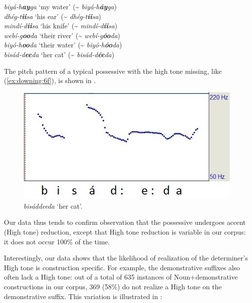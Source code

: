 \documentclass[output=paper]{langscibook}
\begin{document}
\ea\label{ex:downing:6}
\ea  \textit{biyá-h}\textbf{\textit{ay}}\textit{ga}   ‘my water’  ({\textasciitilde} \textit{biyá-h}\textbf{\textit{áy}}\textit{ga}) \label{ex:downing:6a}\\
\ex   \textit{dhég-t}\textbf{\textit{ii}}\textit{sa}   ‘his ear’  ({\textasciitilde} \textit{dhég-t}\textbf{\textit{íi}}\textit{sa})\label{ex:downing:6b}\\
\ex   \textit{mindí-d}\textbf{\textit{ii}}\textit{sa}   ‘his knife’  ({\textasciitilde} \textit{mindí-d}\textbf{\textit{íi}}\textit{sa})\label{ex:downing:6c}\\
\ex   \textit{webí-g}\textbf{\textit{oo}}\textit{da}  ‘their river’  ({\textasciitilde} \textit{webí-g}\textbf{\textit{óo}}\textit{da})\label{ex:downing:6d}\\
\ex   \textit{biyó-h}\textbf{\textit{oo}}\textit{da}   ‘their water’  ({\textasciitilde} \textit{biyó-h}\textbf{\textit{óo}}\textit{da})\label{ex:downing:6e}\\
\ex   \textit{bisád-d}\textbf{\textit{ee}}\textit{da}   ‘her cat’  ({\textasciitilde} \textit{bisád-d}\textbf{\textit{ée}}\textit{da})\label{ex:downing:6f}\\
\z
\z

The pitch pattern of a typical possessive with the high tone missing, like (\ref{ex:downing:6f}), is shown in .

  
\begin{figure}  
\includegraphics[width=.75\textwidth]{figures/downing-img1.jpg}
\caption{ \textit{bisáddeeda} ‘her cat’.}
\label{fig:downing:1}
\end{figure}



Our data thus tends to confirm  observation that the possessive undergoes accent (High tone) reduction, except that High tone reduction is variable in our corpus: it does not occur 100\% of the time.

Interestingly, our data shows that the likelihood of realization of the determiner’s High tone is construction specific. For example, the demonstrative suffixes also often lack a High tone: out of a total of 635 instances of Noun+demonstrative constructions in our corpus, 369 (58\%) do not realize a High tone on the demonstrative suffix. This variation is illustrated in :
\end{document}
